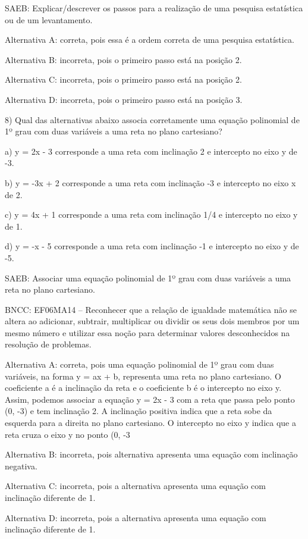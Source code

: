 SAEB: Explicar/descrever os passos para a realização de uma pesquisa
estatística ou de um levantamento.

Alternativa A: correta, pois essa é a ordem correta de uma pesquisa
estatística.

Alternativa B: incorreta, pois o primeiro passo está na posição 2.

Alternativa C: incorreta, pois o primeiro passo está na posição 2.

Alternativa D: incorreta, pois o primeiro passo está na posição 3.

8) Qual das alternativas abaixo associa corretamente uma equação
polinomial de 1º grau com duas variáveis a uma reta no plano cartesiano?

a) y = 2x - 3 corresponde a uma reta com inclinação 2 e intercepto no
eixo y de -3.

b) y = -3x + 2 corresponde a uma reta com inclinação -3 e intercepto no
eixo x de 2.

c) y = 4x + 1 corresponde a uma reta com inclinação 1/4 e intercepto no
eixo y de 1.

d) y = -x - 5 corresponde a uma reta com inclinação -1 e intercepto no
eixo y de -5.

SAEB: Associar uma equação polinomial de 1º grau com duas variáveis a
uma reta no plano cartesiano.

BNCC: EF06MA14 -- Reconhecer que a relação de igualdade matemática não
se altera ao adicionar, subtrair, multiplicar ou dividir os seus dois
membros por um mesmo número e utilizar essa noção para determinar
valores desconhecidos na resolução de problemas.

Alternativa A: correta, pois uma equação polinomial de 1º grau com duas
variáveis, na forma y = ax + b, representa uma reta no plano cartesiano.
O coeficiente a é a inclinação da reta e o coeficiente b é o intercepto
no eixo y. Assim, podemos associar a equação y = 2x - 3 com a reta que
passa pelo ponto (0, -3) e tem inclinação 2. A inclinação positiva
indica que a reta sobe da esquerda para a direita no plano cartesiano. O
intercepto no eixo y indica que a reta cruza o eixo y no ponto (0, -3

Alternativa B: incorreta, pois alternativa apresenta uma equação com
inclinação negativa.

Alternativa C: incorreta, pois a alternativa apresenta uma equação com
inclinação diferente de 1.

Alternativa D: incorreta, pois a alternativa apresenta uma equação com
inclinação diferente de 1.

